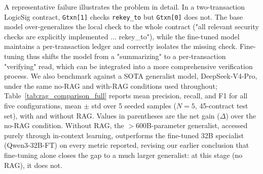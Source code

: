 \documentclass[lettersize,journal]{IEEEtran}
\begin{document}
A representative failure illustrates the problem in detail. In a two-transaction LogicSig contract,
\texttt{Gtxn[1]} checks \texttt{rekey\_to} but \texttt{Gtxn[0]} does not. The base model
over-generalizes the local check to the whole contract ("all relevant security checks are explicitly
implemented ... rekey\_to"), while the fine-tuned model maintains a per-transaction ledger and
correctly isolates the missing check. Fine-tuning thus shifts the model from a "summarizing" to a
per-transaction "verifying" read, which can be integrated into a more comprehensive verification process.
We also benchmark against a SOTA generalist model, DeepSeek-V4-Pro, under the same no-RAG and
with-RAG conditions used throughout; Table~\ref{tab:rag_comparison_full} reports mean precision,
recall, and F1 for all five configurations, mean $\pm$ std over 5 seeded samples ($N=5$,
45-contract test set), with and without RAG. Values in parentheses are the net gain ($\Delta$) over
the no-RAG condition. Without RAG, the $>$600B-parameter generalist, accessed purely through
in-context learning, outperforms the fine-tuned 32B specialist (Qwen3-32B-FT) on every metric
reported, revising our earlier conclusion \cite{boi2025} that fine-tuning alone closes the gap to a
much larger generalist: at this stage (no RAG), it does not.
\end{document}
